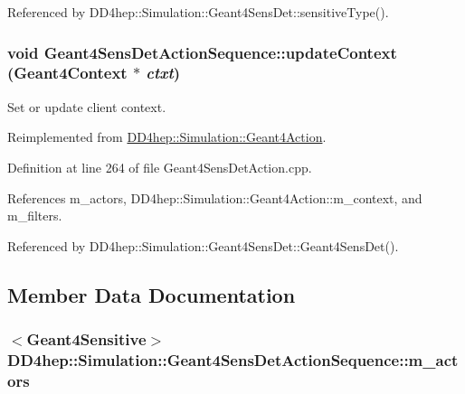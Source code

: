 Referenced by DD4hep::Simulation::Geant4SensDet::sensitiveType().\hypertarget{class_d_d4hep_1_1_simulation_1_1_geant4_sens_det_action_sequence_a5878271f8da03d02bf4b3b8145246775}{
\subsubsection[{updateContext}]{\setlength{\rightskip}{0pt plus 5cm}void Geant4SensDetActionSequence::updateContext ({\bf Geant4Context} $\ast$ {\em ctxt})}}
\label{class_d_d4hep_1_1_simulation_1_1_geant4_sens_det_action_sequence_a5878271f8da03d02bf4b3b8145246775}


Set or update client context. 

Reimplemented from \hyperlink{class_d_d4hep_1_1_simulation_1_1_geant4_action_ae3b9daf2af881df956c46568c0743313}{DD4hep::Simulation::Geant4Action}.

Definition at line 264 of file Geant4SensDetAction.cpp.

References m\_\-actors, DD4hep::Simulation::Geant4Action::m\_\-context, and m\_\-filters.

Referenced by DD4hep::Simulation::Geant4SensDet::Geant4SensDet().

\subsection{Member Data Documentation}
\hypertarget{class_d_d4hep_1_1_simulation_1_1_geant4_sens_det_action_sequence_aa383f58ddce351dc9df9451bee3feb0f}{
\subsubsection[{m\_\-actors}]{$<${\bf Geant4Sensitive}$>$ {\bf DD4hep::Simulation::Geant4SensDetActionSequence::m\_\-actors}}}
\label{class_d_d4hep_1_1_simulation_1_1_geant4_sens_det_action_sequence_aa383f58ddce351dc9df9451bee3feb0f}


